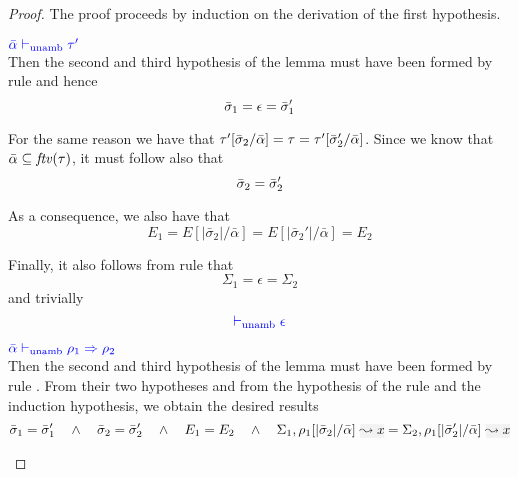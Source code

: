 \begin{proof}
The proof proceeds by induction on the derivation of the first hypothesis.
\begin{description}
\setlength{\itemsep}{1em}
\item[\fbox{\rref{UA-Simp}}]\quad${\color{blue} \bar{\alpha} \vdash_{\mathrm{unamb}} \tau'}$ \\

  Then the second and third hypothesis of the lemma must have been formed by rule 
  and hence 
\begin{equation*}
  \bar{\sigma}_1 = \epsilon = \bar{\sigma}_1'
\end{equation*}
  
  For the same reason we have that $\tau'[\bar{\sigma}_2/\bar{\alpha}] = \tau = \tau'[\bar{\sigma}_2'/\bar{\alpha}]$. Since we know that $\bar{\alpha} \subseteq \mathit{ftv}(\tau)$, it must follow also that
\begin{equation*}
  \bar{\sigma}_2 = \bar{\sigma}_2'
\end{equation*}

  As a consequence, we also have that
\begin{equation*}
  E_1 = E[|\bar{\sigma}_2|/\bar{\alpha}] = E[|\bar{\sigma}_2'|/\bar{\alpha}] = E_2
\end{equation*}

  Finally, it also follows from rule  that
\begin{equation*}
  \Sigma_1 = \epsilon = \Sigma_2
\end{equation*}
  and trivially
\begin{equation*}
  {\color{blue}  \vdash_{\mathrm{unamb}}\epsilon}
\end{equation*}
\item[\fbox{\rref{UA-IAbs}}]\quad${\color{blue} \bar{\alpha} \vdash_{\mathrm{unamb}} \rho_1 \Rightarrow \rho_2}$ \\

  Then the second and third hypothesis of the lemma must have been formed by rule .
  From their two hypotheses and from the hypothesis of the rule and the induction hypothesis, we obtain
  the desired results
\begin{equation*}
  \bar{\suty}_1 = \bar{\suty}_1' \andl \bar{\suty}_2 = \bar{\suty}_2'
  \andl
  E_1 = E_2
  \andl
  \Sigma_1,\ie{\rulet_1[|\bar{\sigma}_2|/\bar{\alpha}]}{x}
  = 
  \Sigma_2,\ie{\rulet_1[|\bar{\sigma}_2'|/\bar{\alpha}]}{x}
\end{equation*}


\end{description}
\end{proof}
